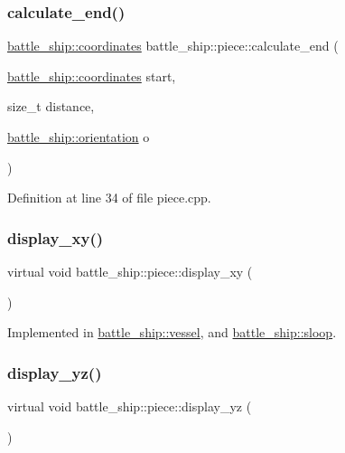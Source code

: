 \subsubsection{\texorpdfstring{calculate\+\_\+end()}{calculate\_end()}}
{\footnotesize\ttfamily \hyperlink{structbattle__ship_1_1coordinates}{battle\+\_\+ship\+::coordinates} battle\+\_\+ship\+::piece\+::calculate\+\_\+end (\begin{DoxyParamCaption}\item[{\hyperlink{structbattle__ship_1_1coordinates}{battle\+\_\+ship\+::coordinates}}]{start,  }\item[{size\+\_\+t}]{distance,  }\item[{\hyperlink{namespacebattle__ship_aed87488f0a73f0d0679fe343fb61c784}{battle\+\_\+ship\+::orientation}}]{o }\end{DoxyParamCaption})}



Definition at line 34 of file piece.\+cpp.

\mbox{\label{classbattle__ship_1_1piece_a0f900b13641277ae9e809e4baa5c8c10}} 
\subsubsection{\texorpdfstring{display\+\_\+xy()}{display\_xy()}}
{\footnotesize\ttfamily virtual void battle\+\_\+ship\+::piece\+::display\+\_\+xy (\begin{DoxyParamCaption}{ }\end{DoxyParamCaption})\hspace{0.3cm}{\ttfamily [pure virtual]}}



Implemented in \hyperlink{classbattle__ship_1_1vessel_a9e72e4a65466cbfe4c550d3741dbe824}{battle\+\_\+ship\+::vessel}, and \hyperlink{classbattle__ship_1_1sloop_a4448d666d4d7a4524618ad88e4dc802e}{battle\+\_\+ship\+::sloop}.

\mbox{\label{classbattle__ship_1_1piece_ad46ddc76d6e682a4f1fc8965a0c7813c}} 
\subsubsection{\texorpdfstring{display\+\_\+yz()}{display\_yz()}}
{\footnotesize\ttfamily virtual void battle\+\_\+ship\+::piece\+::display\+\_\+yz (\begin{DoxyParamCaption}{ }\end{DoxyParamCaption})\hspace{0.3cm}{\ttfamily [pure virtual]}}



